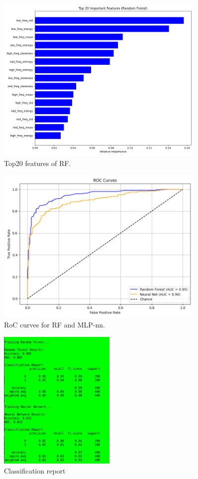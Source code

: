 \documentclass[11pt,a4paper]{article}
\begin{document}
		\begin{figure}[h]
			\centering
			\includegraphics[width=0.9\textwidth]{images/freq_top_rf.png}
			\caption{Top20 features of RF.}
			\label{fig1:}
		\end{figure}		

		\begin{figure}[H]
			\centering
			\includegraphics[width=0.9\textwidth]{images/freq_roc.png}
			\caption{RoC curves for RF and MLP-nn.}
			\label{fig1:}
		\end{figure}		

		\begin{figure}[H]
			\centering
			\includegraphics[width=0.5\textwidth]{images/report_freq.png}
			\caption{Classification report}
			\label{fig1:}
		\end{figure}		
\end{document}
